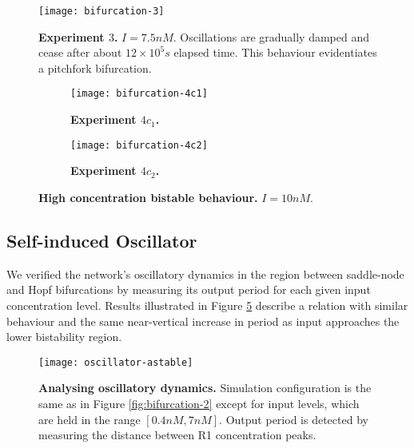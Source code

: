     \begin{figure}[!htbp]
      \centering
      \texttt{[image: bifurcation-3]}
      \caption{\textbf{Experiment $3$.} $I = 7.5nM$. Oscillations are gradually damped and cease after about $12 \times 10^5 s$ elapsed time. This behaviour evidentiates a pitchfork bifurcation.}
      \label{fig:bifurcation-3}
    \end{figure}

    \begin{figure}[!htb]
      \centering
      \begin{subfigure}[t]{0.72\textwidth}
        \centering
        \texttt{[image: bifurcation-4c1]}
        \caption{\textbf{Experiment $4c_{1}$.}}
        \label{fig:bifurcation-4c1}
      \end{subfigure}
      \begin{subfigure}[t]{0.72\textwidth}
        \centering
        \texttt{[image: bifurcation-4c2]}
        \caption{\textbf{Experiment $4c_{2}$.}}
        \label{fig:bifurcation-4c2}
      \end{subfigure}
      \caption{\textbf{High concentration bistable behaviour.} $I = 10 nM$.}
      \label{fig:bifurcation-4}
    \end{figure}


  \subsection{Self-induced Oscillator}

    We verified the network's oscillatory dynamics in the region between saddle-node and Hopf bifurcations by measuring its output period for each given input concentration level.
    Results illustrated in Figure \ref{fig:oscillator-astable} describe a relation with similar behaviour and the same near-vertical increase in period as input approaches the lower bistability region.

    \begin{figure}[!htb]
      \centering
      \texttt{[image: oscillator-astable]}
      \caption{\textbf{Analysing oscillatory dynamics.} Simulation configuration is the same as in Figure \ref{fig:bifurcation-2} except for input levels, which are held in the range $[0.4 nM, 7 nM]$. Output period is detected by measuring the distance between R1 concentration peaks.}
      \label{fig:oscillator-astable}
    \end{figure}


